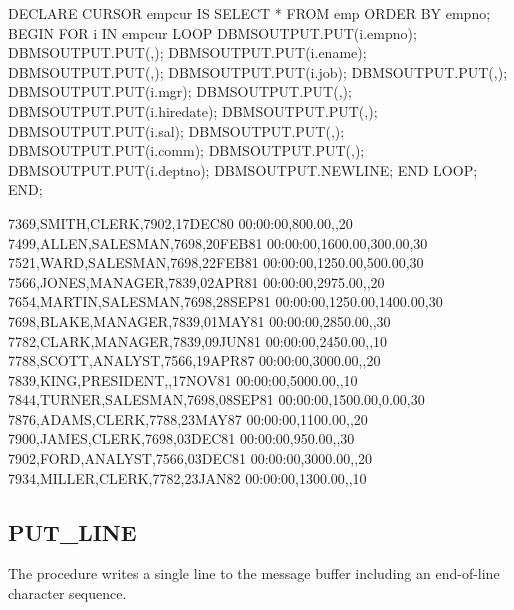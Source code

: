 \documentclass[letterpaper,10pt,english,openany,oneside]{sphinxmanual}
\begin{document}
%
\begin{sphinxVerbatim}[commandchars=\\\{\}]
DECLARE
    CURSOR emp\PYGZus{}cur IS SELECT * FROM emp ORDER BY empno;
BEGIN
    FOR i IN emp\PYGZus{}cur LOOP
        DBMS\PYGZus{}OUTPUT.PUT(i.empno);
        DBMS\PYGZus{}OUTPUT.PUT(\PYGZsq{},\PYGZsq{});
        DBMS\PYGZus{}OUTPUT.PUT(i.ename);
        DBMS\PYGZus{}OUTPUT.PUT(\PYGZsq{},\PYGZsq{});
        DBMS\PYGZus{}OUTPUT.PUT(i.job);
        DBMS\PYGZus{}OUTPUT.PUT(\PYGZsq{},\PYGZsq{});
        DBMS\PYGZus{}OUTPUT.PUT(i.mgr);
        DBMS\PYGZus{}OUTPUT.PUT(\PYGZsq{},\PYGZsq{});
        DBMS\PYGZus{}OUTPUT.PUT(i.hiredate);
        DBMS\PYGZus{}OUTPUT.PUT(\PYGZsq{},\PYGZsq{});
        DBMS\PYGZus{}OUTPUT.PUT(i.sal);
        DBMS\PYGZus{}OUTPUT.PUT(\PYGZsq{},\PYGZsq{});
        DBMS\PYGZus{}OUTPUT.PUT(i.comm);
        DBMS\PYGZus{}OUTPUT.PUT(\PYGZsq{},\PYGZsq{});
        DBMS\PYGZus{}OUTPUT.PUT(i.deptno);
        DBMS\PYGZus{}OUTPUT.NEW\PYGZus{}LINE;
    END LOOP;
END;

7369,SMITH,CLERK,7902,17\PYGZhy{}DEC\PYGZhy{}80 00:00:00,800.00,,20
7499,ALLEN,SALESMAN,7698,20\PYGZhy{}FEB\PYGZhy{}81 00:00:00,1600.00,300.00,30
7521,WARD,SALESMAN,7698,22\PYGZhy{}FEB\PYGZhy{}81 00:00:00,1250.00,500.00,30
7566,JONES,MANAGER,7839,02\PYGZhy{}APR\PYGZhy{}81 00:00:00,2975.00,,20
7654,MARTIN,SALESMAN,7698,28\PYGZhy{}SEP\PYGZhy{}81 00:00:00,1250.00,1400.00,30
7698,BLAKE,MANAGER,7839,01\PYGZhy{}MAY\PYGZhy{}81 00:00:00,2850.00,,30
7782,CLARK,MANAGER,7839,09\PYGZhy{}JUN\PYGZhy{}81 00:00:00,2450.00,,10
7788,SCOTT,ANALYST,7566,19\PYGZhy{}APR\PYGZhy{}87 00:00:00,3000.00,,20
7839,KING,PRESIDENT,,17\PYGZhy{}NOV\PYGZhy{}81 00:00:00,5000.00,,10
7844,TURNER,SALESMAN,7698,08\PYGZhy{}SEP\PYGZhy{}81 00:00:00,1500.00,0.00,30
7876,ADAMS,CLERK,7788,23\PYGZhy{}MAY\PYGZhy{}87 00:00:00,1100.00,,20
7900,JAMES,CLERK,7698,03\PYGZhy{}DEC\PYGZhy{}81 00:00:00,950.00,,30
7902,FORD,ANALYST,7566,03\PYGZhy{}DEC\PYGZhy{}81 00:00:00,3000.00,,20
7934,MILLER,CLERK,7782,23\PYGZhy{}JAN\PYGZhy{}82 00:00:00,1300.00,,10
\end{sphinxVerbatim}

\newpage

\ignorespaces 

\subsection{PUT\_LINE}
\label{\detokenize{dbms_output:index-8}}\label{\detokenize{dbms_output:put-line}}
The  procedure writes a single line to the message buffer
including an end-of-line character sequence.
\begin{quote}

\end{quote}
\end{document}
